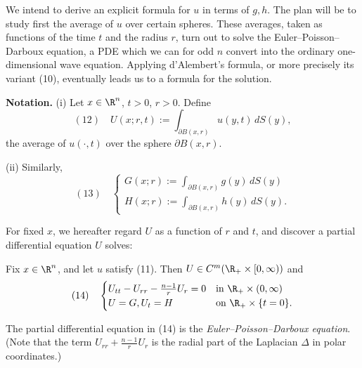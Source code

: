 We intend to derive an explicit formula for $u$ in terms of $g, h$. The plan will be to study first the average of $u$ over certain spheres. These averages, taken as functions of the time $t$ and the radius $r$, turn out to solve the Euler--Poisson--Darboux equation, a PDE which we can for odd $n$ convert into the ordinary one-dimensional wave equation. Applying d'Alembert's formula, or more precisely its variant (10), eventually leads us to a formula for the solution.

\textbf{Notation.} (i) Let $x \in \R^n$, $t > 0$, $r > 0$. Define
$$(12) \quad U(x;r,t) := \int_{\partial B(x,r)} u(y,t) \, dS(y),$$
the average of $u(\cdot, t)$ over the sphere $\partial B(x, r)$.

(ii) Similarly,
$$(13) \quad \begin{cases} G(x;r) := \int_{\partial B(x,r)} g(y) \, dS(y) \\ H(x;r) := \int_{\partial B(x,r)} h(y) \, dS(y). \end{cases}$$

For fixed $x$, we hereafter regard $U$ as a function of $r$ and $t$, and discover a partial differential equation $U$ solves:

\begin{lemma}
\label{lem:euler-poisson-darboux-equation}
Fix $x \in \R^n$, and let $u$ satisfy (11). Then $U \in C^m(\R_+ \times [0, \infty))$ and
$$(14) \quad \begin{cases} U_{tt} - U_{rr} - \frac{n-1}{r} U_r = 0 & \text{in } \R_+ \times (0, \infty) \\ U = G, U_t = H & \text{on } \R_+ \times \{t = 0\}. \end{cases}$$
\end{lemma}

The partial differential equation in (14) is the \textit{Euler--Poisson--Darboux equation}. (Note that the term $U_{rr} + \frac{n-1}{r} U_r$ is the radial part of the Laplacian $\Delta$ in polar coordinates.)

